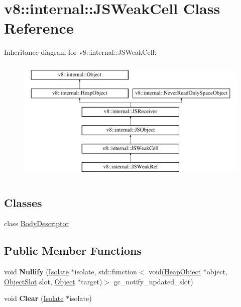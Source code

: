 \hypertarget{classv8_1_1internal_1_1JSWeakCell}{}\section{v8\+:\+:internal\+:\+:J\+S\+Weak\+Cell Class Reference}
\label{classv8_1_1internal_1_1JSWeakCell}
Inheritance diagram for v8\+:\+:internal\+:\+:J\+S\+Weak\+Cell\+:\begin{figure}[H]
\begin{center}
\leavevmode
\includegraphics[height=6.000000cm]{classv8_1_1internal_1_1JSWeakCell}
\end{center}
\end{figure}
\subsection*{Classes}
\begin{DoxyCompactItemize}
\item 
class \mbox{\hyperlink{classv8_1_1internal_1_1JSWeakCell_1_1BodyDescriptor}{Body\+Descriptor}}
\end{DoxyCompactItemize}
\subsection*{Public Member Functions}
\begin{DoxyCompactItemize}
\item 
\mbox{\label{classv8_1_1internal_1_1JSWeakCell_a5e821058a168184ae4635f455bd7738e}} 
void {\bfseries Nullify} (\mbox{\hyperlink{classv8_1_1internal_1_1Isolate}{Isolate}} $\ast$isolate, std\+::function$<$ void(\mbox{\hyperlink{classv8_1_1internal_1_1HeapObject}{Heap\+Object}} $\ast$object, \mbox{\hyperlink{classv8_1_1internal_1_1ObjectSlot}{Object\+Slot}} slot, \mbox{\hyperlink{classv8_1_1internal_1_1Object}{Object}} $\ast$target)$>$ gc\+\_\+notify\+\_\+updated\+\_\+slot)
\item 
\mbox{\label{classv8_1_1internal_1_1JSWeakCell_ac57f2afd7c6e1c26e4c13af7f469347c}} 
void {\bfseries Clear} (\mbox{\hyperlink{classv8_1_1internal_1_1Isolate}{Isolate}} $\ast$isolate)
\end{DoxyCompactItemize}
